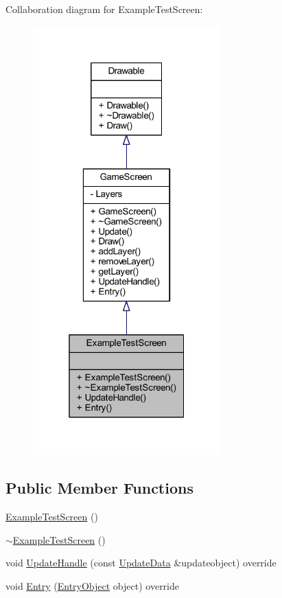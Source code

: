 Collaboration diagram for Example\-Test\-Screen\-:\nopagebreak
\begin{figure}[H]
\begin{center}
\leavevmode
\includegraphics[width=205pt]{class_example_test_screen__coll__graph}
\end{center}
\end{figure}
\subsection*{Public Member Functions}
\begin{DoxyCompactItemize}
\item 
\hyperlink{class_example_test_screen_aa98a7d000384c1352178d179414c1435}{Example\-Test\-Screen} ()
\item 
\hyperlink{class_example_test_screen_a1b9bc6ee5fa89ce2460b2d60ee9ec924}{$\sim$\-Example\-Test\-Screen} ()
\item 
void \hyperlink{class_example_test_screen_a44f0c5ae87832e341d6eb9b44f811969}{Update\-Handle} (const \hyperlink{class_update_data}{Update\-Data} \&updateobject) override
\item 
void \hyperlink{class_example_test_screen_ac125607c70fd06f1a56c97f4f93cdd8b}{Entry} (\hyperlink{class_entry_object}{Entry\-Object} object) override
\end{DoxyCompactItemize}


